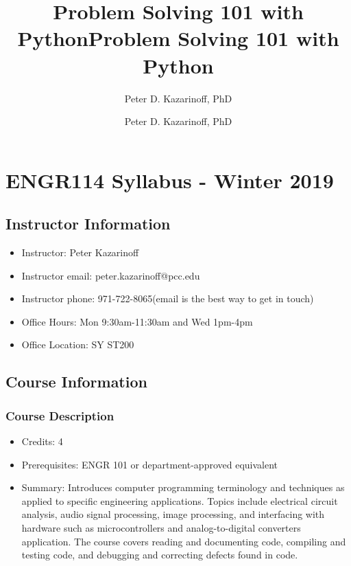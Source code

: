 \documentclass[11pt]{article}
\title{Problem Solving 101 with Python}
\author{Peter D. Kazarinoff, PhD}
\date{}
\title{Problem Solving 101 with Python}
\author{Peter D. Kazarinoff, PhD}
\date{}
\providecommand{\tightlist}{%
      \setlength{\itemsep}{0pt}\setlength{\parskip}{0pt}}
\begin{document}
    
    
    

    
    

    
    \hypertarget{engr114-syllabus---winter-2019}{%
\section{ENGR114 Syllabus - Winter
2019}\label{engr114-syllabus---winter-2019}}

    \hypertarget{instructor-information}{%
\subsection{Instructor Information}\label{instructor-information}}

\begin{itemize}
\tightlist
\item
  Instructor: Peter Kazarinoff
\item
  Instructor email: peter.kazarinoff@pcc.edu
\item
  Instructor phone: 971-722-8065(email is the best way to get in touch)
\item
  Office Hours: Mon 9:30am-11:30am and Wed 1pm-4pm
\item
  Office Location: SY ST200
\end{itemize}

    \hypertarget{course-information}{%
\subsection{Course Information}\label{course-information}}

\hypertarget{course-description}{%
\subsubsection{Course Description}\label{course-description}}

\begin{itemize}
\tightlist
\item
  Credits: 4
\item
  Prerequisites: ENGR 101 or department-approved equivalent
\item
  Summary: Introduces computer programming terminology and techniques as
  applied to specific engineering applications. Topics include
  electrical circuit analysis, audio signal processing, image
  processing, and interfacing with hardware such as microcontrollers and
  analog-to-digital converters application. The course covers reading
  and documenting code, compiling and testing code, and debugging and
  correcting defects found in code.
\end{itemize}
\end{document}
